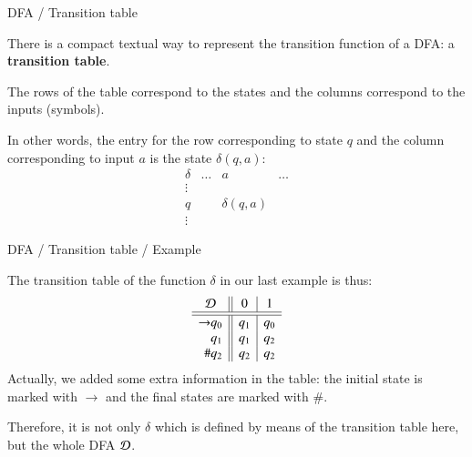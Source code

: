 \documentclass[compress,dvips,xcolor={dvipsnames},t]{beamer}
\begin{document}
%
\begin{frame}{DFA / Transition table}

There is a compact textual way to represent the transition function of
a DFA: a \textbf{transition table}.

\bigskip

The rows of the table correspond to the states and the columns
correspond to the inputs (symbols).

\bigskip

In other words, the entry for the row corresponding to state \(q\) and
the column corresponding to input \(a\) is the state \(\delta (q,
a)\):
\[
\begin{array}{c||c|c|c}
\delta & \ldots & a & \ldots\\
\hline\hline
\vdots & & &\\
\hline
q & & \delta (q, a)\\
\hline
\vdots & & &
\end{array}
\]

\end{frame}

%
\begin{frame}{DFA / Transition table / Example}

The transition table of the function \(\delta\) in our last example is
thus:
\[
\begin{array}{r@{}l||c|c}
\multicolumn{2}{c||}{\cal D} & 0 & 1\\
\hline\hline
\rightarrow & q_0 & q_1 & q_0\\
            & q_1 & q_1 & q_2\\
         \# & q_2 & q_2 & q_2
\end{array}
\]
Actually, we added some extra information in the table: the initial
state is marked with \(\rightarrow\) and the final states are marked
with \(\#\).

\bigskip

Therefore, it is not only \(\delta\) which is defined by means of the
transition table here, but the whole DFA \(\cal D\).

\end{frame}
\end{document}

